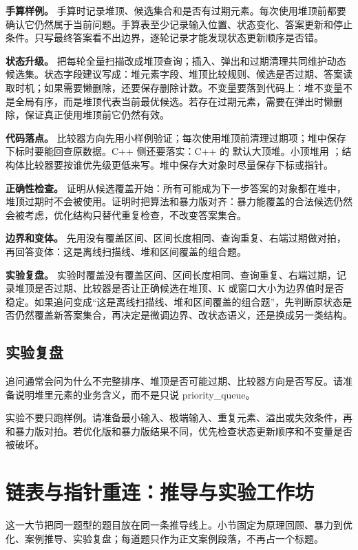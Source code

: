 \textbf{手算样例。} 手算时记录堆顶、候选集合和是否有过期元素。每次使用堆顶前都要确认它仍然属于当前问题。手算表至少记录输入位置、状态变化、答案更新和停止条件。只写最终答案看不出边界，逐轮记录才能发现状态更新顺序是否错。

\textbf{状态升级。} 把每轮全量扫描改成堆顶查询；插入、弹出和过期清理共同维护动态候选集。状态字段建议写成：堆元素字段、堆顶比较规则、候选是否过期、答案读取时机；如果需要懒删除，还要保存删除计数。不变量要落到代码上：堆不变量不是全局有序，而是堆顶代表当前最优候选。若存在过期元素，需要在弹出时懒删除，保证真正使用堆顶前它仍然有效。

\textbf{代码落点。} 比较器方向先用小样例验证；每次使用堆顶前清理过期项；堆中保存下标时要能回查原数据。C++ 侧还要落实：C++ 的  默认大顶堆。小顶堆用 ；结构体比较器要按谁优先级更低来写。堆中保存大对象时尽量保存下标或指针。

\textbf{正确性检查。} 证明从候选覆盖开始：所有可能成为下一步答案的对象都在堆中，堆顶过期时不会被使用。证明时把算法和暴力版对齐：暴力能覆盖的合法候选仍然会被考虑，优化结构只替代重复检查，不改变答案集合。

\textbf{边界和变体。} 先用没有覆盖区间、区间长度相同、查询重复、右端过期做对拍，再回答变体：这是离线扫描线、堆和区间覆盖的组合题。

\textbf{实验复盘。} 实验时覆盖没有覆盖区间、区间长度相同、查询重复、右端过期，记录堆顶是否过期、比较器是否让正确候选在堆顶、K 或窗口大小为边界值时是否稳定。如果追问变成“这是离线扫描线、堆和区间覆盖的组合题”，先判断原状态是否仍然覆盖新答案集合，再决定是微调边界、改状态语义，还是换成另一类结构。

\subsection{实验复盘}

追问通常会问为什么不完整排序、堆顶是否可能过期、比较器方向是否写反。请准备说明堆里元素的业务含义，而不是只说 priority\_queue。

实验不要只跑样例。请准备最小输入、极端输入、重复元素、溢出或失效条件，再和暴力版对拍。若优化版和暴力版结果不同，优先检查状态更新顺序和不变量是否被破坏。

\section{链表与指针重连：推导与实验工作坊}
这一大节把同一题型的题目放在同一条推导线上。小节固定为原理回顾、暴力到优化、案例推导、实验复盘；每道题只作为正文案例段落，不再占一个标题。

